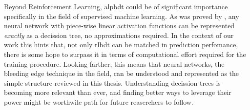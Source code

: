 Beyond Reinforcement Learning, \ac{alpbdt} could be of significant importance
specifically in the field of supervised machine learning. As was proved by
\cite{caglar22}, any neural network with piece-wise linear activation functions
can be represented \emph{exactly} as a decission tree, no approximations
required. In the context of our work this hints that, not only \ac{rlbdt}
\cite{xiong} can be matched in prediction perfomance, there is some hope to
surpass it in terms of computational effort required for the training procedure.
Looking farther, this means that neural networks, the bleeding edge technique in
the field, can be understood and represented as the simple structure reviewed in
this thesis. Understanding decission trees is becoming more relevant than ever,
and finding better ways to leverage their power might be worthwile path for
future reaserchers to follow.